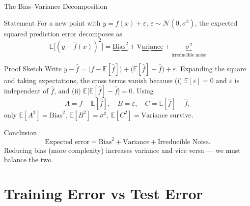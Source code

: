 \documentclass{beamer}
\begin{document}
\begin{frame}[shrink=10]{The Bias--Variance Decomposition}
  \begin{block}{Statement}
    For a new point with $y = f(x)+\varepsilon$, $\varepsilon\sim\mathcal N(0,\sigma^2)$,
    the expected squared prediction error decomposes as
    \[
      \boxed{\;
        \mathbb{E}\bigl[(y - \hat f(x))^2\bigr]
          = \underbrace{\mathrm{Bias}^2}_{}
            + \underbrace{\mathrm{Variance}}_{}
            + \underbrace{\sigma^2}_{\text{irreducible noise}}
      \;}
    \]
  \end{block}

  \begin{block}{Proof Sketch}
    Write $y - \hat f = \bigl(f - \mathbb{E}[\hat f]\bigr)
    + \bigl(\mathbb{E}[\hat f] - \hat f\bigr) + \varepsilon$.
    Expanding the square and taking expectations, the cross terms vanish
    because (i) $\mathbb{E}[\varepsilon]=0$ and $\varepsilon$ is independent
    of $\hat f$, and (ii) $\mathbb{E}\bigl[\mathbb{E}[\hat f]-\hat f\bigr]=0$.
    Using
    \[
      A = f - \mathbb{E}[\hat f],\quad
      B = \varepsilon,\quad
      C = \mathbb{E}[\hat f] - \hat f,
    \]
    only $\mathbb{E}[A^2]=\mathrm{Bias}^2$, $\mathbb{E}[B^2]=\sigma^2$,
    $\mathbb{E}[C^2]=\mathrm{Variance}$ survive.
  \end{block}

  \begin{exampleblock}{Conclusion}
    \[
      \text{Expected error} = \mathrm{Bias}^2 + \mathrm{Variance}
        + \text{Irreducible Noise}.
    \]
    Reducing bias (more complexity) increases variance and vice versa ---
    we must balance the two.
  \end{exampleblock}
\end{frame}

\section{Training Error vs Test Error}
\end{document}
